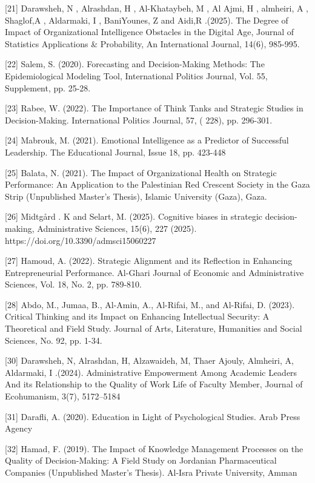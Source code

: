 \documentclass[10pt]{NSP1}
\begin{document}
[21] Darawsheh, N , Alrashdan, H , Al-Khataybeh, M , Al Ajmi, H , almheiri, A , Shaglof,A , Aldarmaki, I , BaniYounes, Z and Aidi,R .(2025). The Degree of Impact of Organizational Intelligence Obstacles in the Digital Age, Journal of Statistics Applications \& Probability, An International Journal, 14(6), 985-995.

[22] Salem, S. (2020). Forecasting and Decision-Making Methods: The Epidemiological Modeling Tool, International Politics Journal, Vol. 55, Supplement, pp. 25-28.

[23] Rabee, W. (2022). The Importance of Think Tanks and Strategic Studies in Decision-Making. International Politics Journal, 57, ( 228), pp. 296-301.

[24] Mabrouk, M. (2021). Emotional Intelligence as a Predictor of Successful Leadership. The Educational Journal, Issue 18, pp. 423-448

[25] Balata, N. (2021). The Impact of Organizational Health on Strategic Performance: An Application to the Palestinian Red Crescent Society in the Gaza Strip (Unpublished Master's Thesis), Islamic University (Gaza), Gaza.

[26] Midtgård . K and Selart, M. (2025). Cognitive biases in strategic decision-making, Administrative Sciences, 15(6), 227 (2025). https://doi.org/10.3390/admsci15060227

[27] Hamoud, A. (2022). Strategic Alignment and its Reflection in Enhancing Entrepreneurial Performance. Al-Ghari Journal of Economic and Administrative Sciences, Vol. 18, No. 2, pp. 789-810.

[28] Abdo, M., Jumaa, B., Al-Amin, A., Al-Rifai, M., and Al-Rifai, D. (2023). Critical Thinking and its Impact on Enhancing Intellectual Security: A Theoretical and Field Study. Journal of Arts, Literature, Humanities and Social Sciences, No. 92, pp. 1-34.

[30] Darawsheh, N, Alrashdan, H, Alzawaideh, M, Thaer Ajouly, Almheiri, A, Aldarmaki, I .(2024). Administrative Empowerment Among Academic Leaders And its Relationship to the Quality of Work Life of Faculty Member, Journal of Ecohumanism, 3(7), 5172--5184

[31] Darafli, A. (2020). Education in Light of Psychological Studies. Arab Press Agency

[32] Hamad, F. (2019). The Impact of Knowledge Management Processes on the Quality of Decision-Making: A Field Study on Jordanian Pharmaceutical Companies (Unpublished Master's Thesis). Al-Isra Private University, Amman
\end{document}
